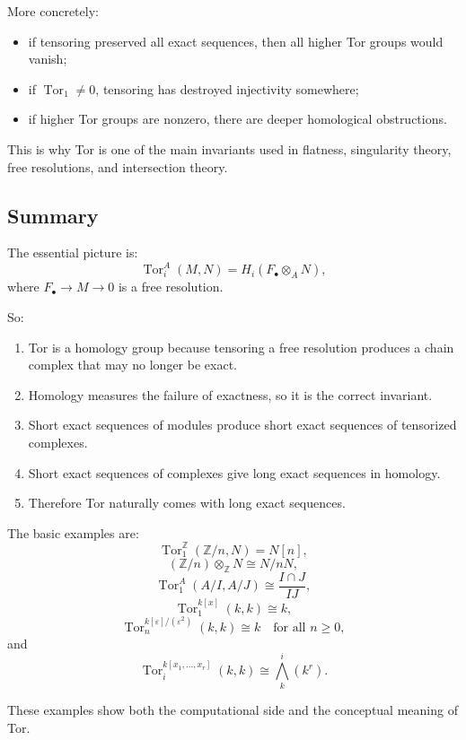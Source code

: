 \documentclass[12pt,a4paper]{article}
\theoremstyle{notespace}
\begin{document}
More concretely:

\begin{itemize}
	\item if tensoring preserved all exact sequences, then all higher Tor groups would vanish;
	\item if \(\operatorname{Tor}_1\neq 0\), tensoring has destroyed injectivity somewhere;
	\item if higher Tor groups are nonzero, there are deeper homological obstructions.
\end{itemize}

This is why Tor is one of the main invariants used in flatness, singularity theory, free resolutions, and intersection theory.

\subsection{Summary}

The essential picture is:
\[
\operatorname{Tor}_i^A(M,N)=H_i(F_\bullet\otimes_A N),
\]
where \(F_\bullet\to M\to 0\) is a free resolution.

So:

\begin{enumerate}
	\item Tor is a homology group because tensoring a free resolution produces a chain complex that may no longer be exact.
	\item Homology measures the failure of exactness, so it is the correct invariant.
	\item Short exact sequences of modules produce short exact sequences of tensorized complexes.
	\item Short exact sequences of complexes give long exact sequences in homology.
	\item Therefore Tor naturally comes with long exact sequences.
\end{enumerate}

The basic examples are:
\[
\operatorname{Tor}_1^{\mathbb Z}(\mathbb Z/n,N)=N[n],
\]
\[
(\mathbb Z/n)\otimes_{\mathbb Z}N\cong N/nN,
\]
\[
\operatorname{Tor}_1^A(A/I,A/J)\cong \frac{I\cap J}{IJ},
\]
\[
\operatorname{Tor}_1^{k[x]}(k,k)\cong k,
\]
\[
\operatorname{Tor}_n^{k[\varepsilon]/(\varepsilon^2)}(k,k)\cong k \quad \text{for all } n\geq 0,
\]
and
\[
\operatorname{Tor}_i^{k[x_1,\dots,x_r]}(k,k)\cong \bigwedge^i_k(k^r).
\]

These examples show both the computational side and the conceptual meaning of Tor.
\end{document}
